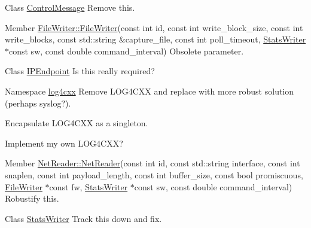 \label{todo__todo000005}
\hypertarget{todo__todo000005}{}
 
\begin{DoxyDescription}
\item[Class \hyperlink{struct_control_message}{ControlMessage} ]Remove this. 
\end{DoxyDescription}

\label{todo__todo000001}
\hypertarget{todo__todo000001}{}
 
\begin{DoxyDescription}
\item[Member \hyperlink{class_file_writer_ae35a8819039ac43d6d1bc6448bf5d9ca}{FileWriter::FileWriter}(const int id, const int write\_\-block\_\-size, const int write\_\-blocks, const std::string \&capture\_\-file, const int poll\_\-timeout, \hyperlink{class_stats_writer}{StatsWriter} $\ast$const sw, const double command\_\-interval) ]Obsolete parameter. 
\end{DoxyDescription}

\label{todo__todo000003}
\hypertarget{todo__todo000003}{}
 
\begin{DoxyDescription}
\item[Class \hyperlink{struct_i_p_endpoint}{IPEndpoint} ]Is this really required? 
\end{DoxyDescription}

\label{todo__todo000002}
\hypertarget{todo__todo000002}{}
 
\begin{DoxyDescription}
\item[Namespace \hyperlink{namespacelog4cxx}{log4cxx} ]Remove LOG4CXX and replace with more robust solution (perhaps syslog?). 

Encapsulate LOG4CXX as a singleton. 

Implement my own LOG4CXX? 
\end{DoxyDescription}

\label{todo__todo000006}
\hypertarget{todo__todo000006}{}
 
\begin{DoxyDescription}
\item[Member \hyperlink{class_net_reader_adadbce06c16a6350aba08f468a7b0d83}{NetReader::NetReader}(const int id, const std::string interface, const int snaplen, const int payload\_\-length, const int buffer\_\-size, const bool promiscuous, \hyperlink{class_file_writer}{FileWriter} $\ast$const fw, \hyperlink{class_stats_writer}{StatsWriter} $\ast$const sw, const double command\_\-interval) ]Robustify this. 
\end{DoxyDescription}

\label{todo__todo000007}
\hypertarget{todo__todo000007}{}
 
\begin{DoxyDescription}
\item[Class \hyperlink{class_stats_writer}{StatsWriter} ]Track this down and fix. 
\end{DoxyDescription}